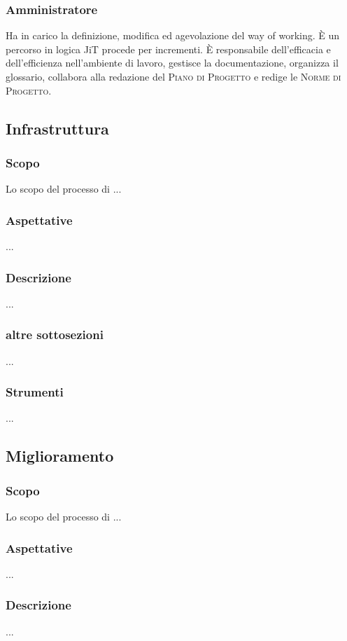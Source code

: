     \subsubsection{Amministratore}
    Ha in carico la definizione, modifica ed agevolazione del way of working. È un percorso in logica JiT procede per incrementi. È responsabile dell'efficacia e dell'efficienza nell'ambiente di lavoro, gestisce la documentazione, organizza il glossario, collabora alla redazione del \textsc{Piano di Progetto} e redige le \textsc{Norme di Progetto}.

\subsection{Infrastruttura} %
    \subsubsection{Scopo}
    Lo scopo del processo di ...
    \subsubsection{Aspettative}
    ...
    \subsubsection{Descrizione}
    ...
    \subsubsection{altre sottosezioni}
    ...
    \subsubsection{Strumenti}
    ...

\subsection{Miglioramento} %
    \subsubsection{Scopo}
    Lo scopo del processo di ...
    \subsubsection{Aspettative}
    ...
    \subsubsection{Descrizione}
    ...
